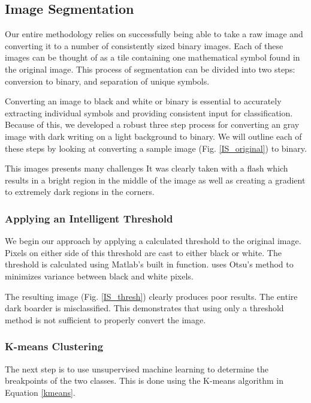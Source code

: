 \subsection{Image Segmentation}
Our entire methodology relies on successfully being able to take a raw image and converting it to a number of consistently sized binary images. Each of these images can be thought of as a tile containing one mathematical symbol found in the original image. This process of segmentation can be divided into two steps: conversion to binary, and separation of unique symbols.

Converting an image to black and white or binary is essential to accurately extracting individual symbols and providing consistent input for classification. Because of this, we developed a robust three step process for converting an gray image with dark writing on a light background to binary. We will outline each of these steps by looking at converting a sample image (Fig. \ref{IS_original}) to binary.


This images presents many challenges It was clearly taken with a flash which results in a bright region in the middle of the image as well as creating a gradient to extremely dark regions in the corners. 

\subsubsection{Applying an Intelligent Threshold}
We begin our approach by applying a calculated threshold to the original image. Pixels on either side of this threshold are cast to either black or white. The threshold is calculated using Matlab's built in  function.  uses Otsu's method to minimizes variance between black and white pixels.


The resulting image (Fig. \ref{IS_thresh}) clearly produces poor results. The entire dark boarder is misclassified. This demonstrates that using only a threshold method is not sufficient to properly convert the image.

\subsubsection{K-means Clustering}
The next step is to use unsupervised machine learning to determine the breakpoints of the two classes. This is done using the K-means algorithm in Equation \ref{kmeans}.

